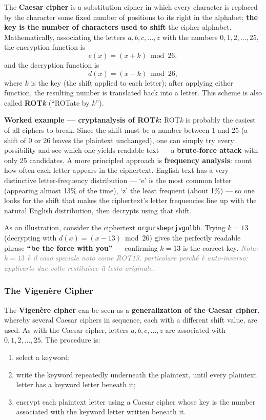 \documentclass[12pt, a4paper]{article}
\begin{document}
The \textbf{Caesar cipher} is a substitution cipher in which every character is replaced by the character some fixed number of positions to its right in the alphabet; \textbf{the key is the number of characters used to shift} the cipher alphabet. Mathematically, associating the letters $a,b,c,\dots,z$ with the numbers $0,1,2,\dots,25$, the encryption function is
\[
e(x) = (x+k) \bmod 26,
\]
and the decryption function is
\[
d(x) = (x-k) \bmod 26,
\]
where $k$ is the key (the shift applied to each letter); after applying either function, the resulting number is translated back into a letter. This scheme is also called \textbf{ROT\textit{k}} (``ROTate by $k$'').

\textbf{Worked example --- cryptanalysis of ROT\textit{k}:} ROT\textit{k} is probably the easiest of all ciphers to break. Since the shift must be a number between 1 and 25 (a shift of 0 or 26 leaves the plaintext unchanged), one can simply try every possibility and see which one yields readable text — a \textbf{brute-force attack} with only 25 candidates. A more principled approach is \textbf{frequency analysis}: count how often each letter appears in the ciphertext. English text has a very distinctive letter-frequency distribution — `e' is the most common letter (appearing almost 13\% of the time), `z' the least frequent (about 1\%) — so one looks for the shift that makes the ciphertext's letter frequencies line up with the natural English distribution, then decrypts using that shift.

As an illustration, consider the ciphertext \texttt{orgursbeprjvgulbh}. Trying $k=13$ (decrypting with $d(x) = (x-13) \bmod 26$) gives the perfectly readable phrase \textbf{``be the force with you''} — confirming $k=13$ is the correct key. \textcolor{gray}{\textit{Nota: $k=13$ è il caso speciale noto come ROT13, particolare perché è auto-inverso: applicarlo due volte restituisce il testo originale.}}

\subsubsection{The Vigenère Cipher}
The \textbf{Vigenère cipher} can be seen as a \textbf{generalization of the Caesar cipher}, whereby several Caesar ciphers in sequence, each with a different shift value, are used. As with the Caesar cipher, letters $a,b,c,\dots,z$ are associated with $0,1,2,\dots,25$. The procedure is:
\begin{enumerate}
    \item select a keyword;
    \item write the keyword repeatedly underneath the plaintext, until every plaintext letter has a keyword letter beneath it;
    \item encrypt each plaintext letter using a Caesar cipher whose key is the number associated with the keyword letter written beneath it.
\end{enumerate}
\end{document}
